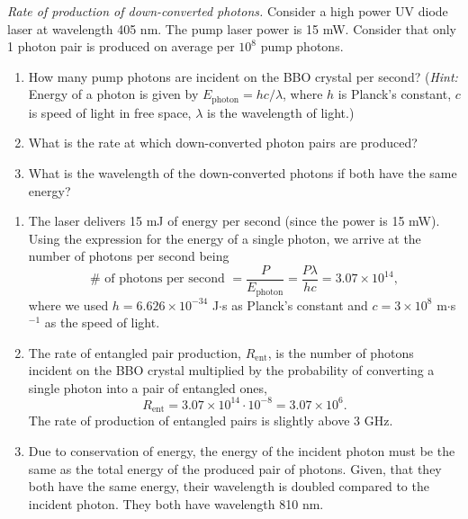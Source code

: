 \begin{exercise}
\emph{Rate of production of down-converted photons.} Consider a high power UV diode laser at wavelength 405 nm. The pump laser power is 15 mW. Consider that only 1 photon pair is produced on average per $10^{8}$ pump photons.
\begin{enumerate}[label=(\alph*)]
    \item How many pump photons are incident on the BBO crystal per second?
    (\emph{Hint:} Energy of a photon is given by $E_{\text{photon}}=hc/\lambda$, where $h$ is Planck's constant, $c$ is speed of light in free space, $\lambda$ is the wavelength of light.)
    \item What is the rate at which down-converted photon pairs are produced?
    \item What is the wavelength of the down-converted photons if both have the same energy?
\end{enumerate}
\end{exercise}
\begin{solution}
\begin{enumerate}[label=(\alph*)]
    \item The laser delivers 15 mJ of energy per second (since the power is 15 mW). Using the expression for the energy of a single photon, we arrive at the number of photons per second being
    \begin{equation*}
        \#\text{ of photons per second } =\frac{P}{E_{\text{photon}}} = \frac{P\lambda}{hc} = 3.07\times10^{14},
    \end{equation*}
    where we used $h=6.626\times10^{-34}$ J$\cdot$s as Planck's constant and $c=3\times10^8$ m$\cdot$s$^{-1}$ as the speed of light.
    \item The rate of entangled pair production, $R_{\text{ent}}$, is the number of photons incident on the BBO crystal multiplied by the probability of converting a single photon into a pair of entangled ones,
    \begin{equation*}
        R_{\text{ent}} = 3.07\times10^{14} \cdot 10^{-8} = 3.07\times10^6.
    \end{equation*}
    The rate of production of entangled pairs is slightly above 3 GHz.
    \item Due to conservation of energy, the energy of the incident photon must be the same as the total energy of the produced pair of photons. Given, that they both have the same energy, their wavelength is doubled compared to the incident photon. They both have wavelength 810 nm.
\end{enumerate}    
\end{solution}


